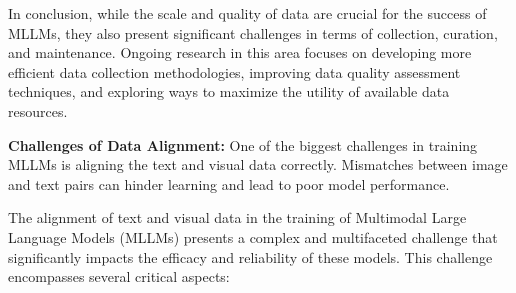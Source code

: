 In conclusion, while the scale and quality of data are crucial for the success of MLLMs, they also present significant challenges in terms of collection, curation, and maintenance. Ongoing research in this area focuses on developing more efficient data collection methodologies, improving data quality assessment techniques, and exploring ways to maximize the utility of available data resources.

\textbf{Challenges of Data Alignment:} One of the biggest challenges in training MLLMs is aligning the text and visual data correctly. Mismatches between image and text pairs can hinder learning and lead to poor model performance.

The alignment of text and visual data in the training of Multimodal Large Language Models (MLLMs) presents a complex and multifaceted challenge that significantly impacts the efficacy and reliability of these models. This challenge encompasses several critical aspects:

